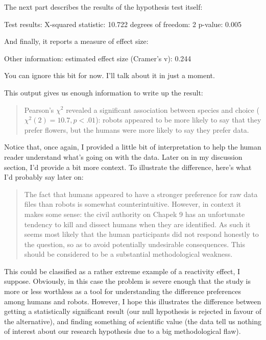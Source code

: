 The next part describes the results of the hypothesis test itself:
\begin{rblock1}
Test results: 
   X-squared statistic:  10.722 
   degrees of freedom:  2 
   p-value:  0.005 
\end{rblock1}

And finally, it reports a measure of effect size:
\begin{rblock1}
Other information: 
   estimated effect size (Cramer's v):  0.244 
\end{rblock1}
You can ignore this bit for now. I'll talk about it in just a moment.

This output gives us enough information to write up the result:
\begin{quote}
Pearson's $\chi^2$ revealed a significant association between species and choice ($\chi^2(2) = 10.7, p < .01$): robots appeared to be more likely to say that they prefer flowers, but the humans were more likely to say they prefer data.
\end{quote}
Notice that, once again, I provided a little bit of interpretation to help the human reader understand what's going on with the data. Later on in my discussion section, I'd provide a bit more context. To illustrate the difference, here's what I'd probably say later on:
\begin{quote}
The fact that humans appeared to have a stronger preference for raw data files than robots is somewhat counterintuitive. However, in context it makes some sense: the civil authority on Chapek 9 has an unfortunate tendency to kill and dissect humans when they are identified. As such it seems most likely that the human participants did not respond honestly to the question, so as to avoid potentially undesirable consequences. This should be considered to be a substantial methodological weakness.
\end{quote}
This could be classified as a rather extreme example of a reactivity effect, I suppose. Obviously, in this case the problem is severe enough that the study is more or less worthless as a tool for understanding the difference preferences among humans and robots. However, I hope this illustrates the difference between getting a statistically significant result (our null hypothesis is rejected in favour of the alternative), and finding something of scientific value (the data tell us nothing of interest about our research hypothesis due to a big methodological flaw).





